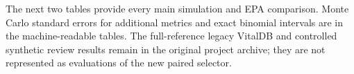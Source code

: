 The next two tables provide every main simulation and EPA comparison. Monte Carlo standard errors for additional metrics and exact binomial intervals are in the machine-readable tables. The full-reference legacy VitalDB and controlled synthetic review results remain in the original project archive; they are not represented as evaluations of the new paired selector.


